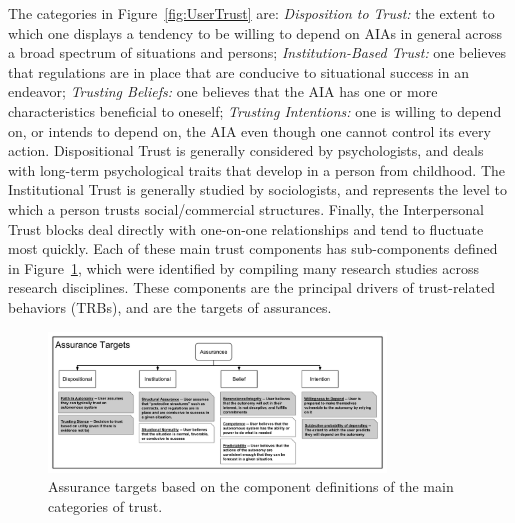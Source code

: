 The categories in Figure~\ref{fig:UserTrust} are: \textit{Disposition to Trust:} the extent to which one displays a tendency to be willing to depend on AIAs in general across a broad spectrum of situations and persons; \textit{Institution-Based Trust:} one believes that regulations are in place that are conducive to situational success in an endeavor; \textit{Trusting Beliefs:} one believes that the AIA has one or more characteristics beneficial to oneself; \textit{Trusting Intentions:} one is willing to depend on, or intends to depend on, the AIA even though one cannot control its every action. Dispositional Trust is generally considered by psychologists, and deals with long-term psychological traits that develop in a person from childhood. The Institutional Trust is generally studied by sociologists, and represents the level to which a person trusts social/commercial structures. Finally, the Interpersonal Trust blocks deal directly with one-on-one relationships and tend to fluctuate most quickly. %
%
%
Each of these main trust components has sub-components defined in Figure~\ref{fig:Assurance_classes}, which were identified by compiling many research studies across research disciplines. %
These components are the principal drivers of trust-related behaviors (TRBs), and are the targets of assurances. %

        \begin{figure}[htbp]
            \includegraphics[width=0.8\textwidth]{Figures/Assurances.pdf}%
            \caption{Assurance targets based on the component definitions of the main categories of trust.} %
            \label{fig:Assurance_classes}
        \end{figure}
